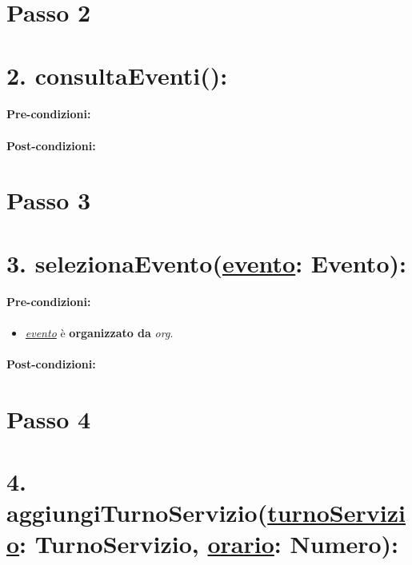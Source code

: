 \section{Passo 2}
\section*{2. consultaEventi():}

\paragraph{Pre-condizioni:}

\paragraph{Post-condizioni:}


\section{Passo 3}
\section*{3. selezionaEvento(\underline{evento}: Evento):}

\paragraph{Pre-condizioni:}
\begin{itemize}
     \item \underline{\textit{evento}} è \textbf{organizzato da} {\textit{org}}.
\end{itemize}

\paragraph{Post-condizioni:}


\section{Passo 4}
\section*{4. aggiungiTurnoServizio(\underline{turnoServizio}: TurnoServizio, \underline{orario}: Numero):}

